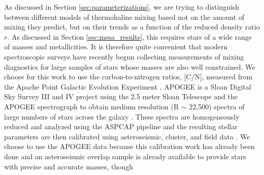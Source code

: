 
As discussed in Section \ref{sec:parameterizations}, we are trying to distinguish between different models of thermohaline mixing based not on the amount of mixing they predict, but on their trends as a function of the reduced density ratio $r$. As discussed in Section \ref{sec:mesa_results}, this requires stars of a wide range of masses and metallicities. It is therefore quite convenient that 
modern spectroscopic surveys have recently begun collecting measurements of mixing diagnostics for large samples of stars whose masses are also well constrained. 
%
We choose for this work to use the carbon-to-nitrogen ratios, [C/N], measured from the Apache Point Galactic Evolution Experiment \citep[APOGEE, ][]{Majewski2017}. APOGEE is a Sloan Digital Sky Survey III and IV \citep{Blanton2017} project using the 2.5 meter Sloan Telescope \citep{Gunn2006} and the APOGEE spectrograph \citep{Wilson2019} to obtain medium resolution (R $\sim$ 22,500) spectra of large numbers of stars across the galaxy \citep{Zasowski2017, Beaton2021,Santana2021}. These spectra are homogeneously reduced and analyzed using the ASPCAP pipeline \citep{Nidever2015, Zamora2015, GarciaPerez2016} and the resulting stellar parameters are then calibrated using asteroseismic, cluster, and field data \citep{Holtzman2015,Holtzman2018, Jonsson2020}. We choose to use the APOGEE data because this calibration work has already been done and an asteroseismic overlap sample is already available to provide stars with precise and accurate masses, though %
